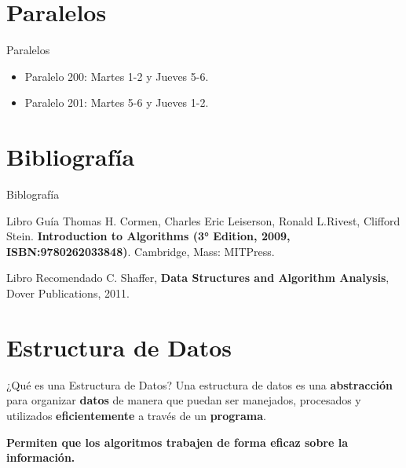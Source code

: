 \documentclass{beamer}
\newcommand{\inputTikZ}[2]{%
	\scalebox{#1}{}
}
\begin{document}
\section{Paralelos}
\begin{frame}{Paralelos}
\begin{itemize}
\item Paralelo 200: Martes 1-2 y Jueves 5-6.
\item Paralelo 201: Martes 5-6 y Jueves 1-2.
\end{itemize}
\end{frame}

\section{Bibliografía}
\begin{frame}{Biblografía}
\begin{alertblock}{Libro Guía}
Thomas H. Cormen, Charles Eric Leiserson, Ronald L.Rivest, Clifford Stein. \textbf{Introduction to Algorithms (3° Edition, 2009, ISBN:9780262033848)}. Cambridge, Mass: MITPress.
\end{alertblock}

\begin{block}{Libro Recomendado}
C. Shaffer, \textbf{Data Structures and Algorithm Analysis}, Dover Publications, 2011. 
\end{block}
\end{frame}

\section{Estructura de Datos}
\begin{frame}{¿Qué es una Estructura de Datos?}
Una estructura de datos es una \textbf{abstracción} para organizar \textbf{datos} de manera que puedan ser manejados, procesados y utilizados \textbf{eficientemente} a través de un \textbf{programa}.

\hspace*{-0.5cm}\inputTikZ{0.7}{images/eda1.tex}

\textbf{Permiten que los algoritmos trabajen de forma eficaz sobre la información.}
\end{frame}
\end{document}
